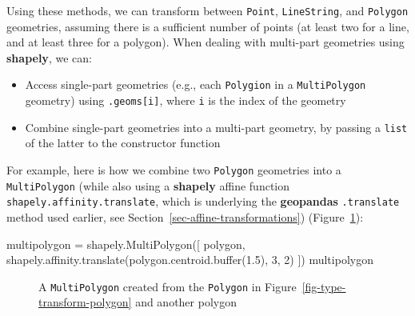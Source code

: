 \documentclass[
  letterpaper,
]{krantz}
\newenvironment{Shaded}{\begin{snugshade}}{\end{snugshade}}
\newcommand{\BuiltInTok}[1]{\textcolor[rgb]{0.00,0.23,0.31}{#1}}
\newcommand{\DecValTok}[1]{\textcolor[rgb]{0.68,0.00,0.00}{#1}}
\newcommand{\FloatTok}[1]{\textcolor[rgb]{0.68,0.00,0.00}{#1}}
\newcommand{\NormalTok}[1]{\textcolor[rgb]{0.00,0.23,0.31}{#1}}
\newcommand{\OperatorTok}[1]{\textcolor[rgb]{0.37,0.37,0.37}{#1}}
\providecommand{\tightlist}{%
  \setlength{\itemsep}{0pt}\setlength{\parskip}{0pt}}\usepackage{longtable,booktabs,array}
\begin{document}
Using these methods, we can transform between
\texttt{\textquotesingle{}Point\textquotesingle{}},
\texttt{\textquotesingle{}LineString\textquotesingle{}}, and
\texttt{\textquotesingle{}Polygon\textquotesingle{}} geometries,
assuming there is a sufficient number of points (at least two for a
line, and at least three for a polygon). When dealing with multi-part
geometries using \textbf{shapely}, we can:

\begin{itemize}
\tightlist
\item
  Access single-part geometries (e.g., each
  \texttt{\textquotesingle{}Polygion\textquotesingle{}} in a
  \texttt{\textquotesingle{}MultiPolygon\textquotesingle{}} geometry)
  using \texttt{.geoms{[}i{]}}, where \texttt{i} is the index of the
  geometry
\item
  Combine single-part geometries into a multi-part geometry, by passing
  a \texttt{list} of the latter to the constructor function
\end{itemize}

For example, here is how we combine two
\texttt{\textquotesingle{}Polygon\textquotesingle{}} geometries into a
\texttt{\textquotesingle{}MultiPolygon\textquotesingle{}} (while also
using a \textbf{shapely} affine function
\texttt{shapely.affinity.translate}, which is underlying the
\textbf{geopandas} \texttt{.translate} method used earlier, see
Section~\ref{sec-affine-transformations})
(Figure~\ref{fig-type-transform-multipolygon}):

\begin{Shaded}
\begin{Highlighting}[]
\NormalTok{multipolygon }\OperatorTok{=}\NormalTok{ shapely.MultiPolygon([}
\NormalTok{    polygon, }
\NormalTok{    shapely.affinity.translate(polygon.centroid.}\BuiltInTok{buffer}\NormalTok{(}\FloatTok{1.5}\NormalTok{), }\DecValTok{3}\NormalTok{, }\DecValTok{2}\NormalTok{)}
\NormalTok{])}
\NormalTok{multipolygon}
\end{Highlighting}
\end{Shaded}

\begin{figure}[H]


\caption{\label{fig-type-transform-multipolygon}A
\texttt{\textquotesingle{}MultiPolygon\textquotesingle{}} created from
the \texttt{\textquotesingle{}Polygon\textquotesingle{}} in
Figure~\ref{fig-type-transform-polygon} and another polygon}

\end{figure}%
\end{document}
